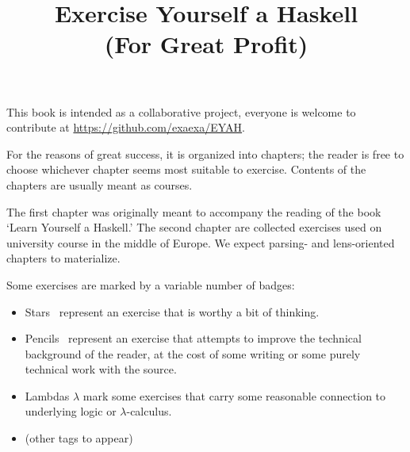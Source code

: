 \documentclass[10pt,a5paper]{book}
\title{Exercise Yourself a Haskell \\ \vspace{1em} \Large (For Great Profit)}
\date{}
\begin{document}
\sloppy

\maketitle

This book is intended as a collaborative project, everyone is welcome to
contribute at \url{https://github.com/exaexa/EYAH}.

For the reasons of great success, it is organized into chapters; the reader is
free to choose whichever chapter seems most suitable to exercise. Contents of
the chapters are usually meant as courses.

The first chapter was originally meant to accompany the reading of the book
`Learn Yourself a Haskell.' The second chapter are collected exercises used on
university course in the middle of Europe. We expect parsing- and lens-oriented
chapters to materialize.

Some exercises are marked by a variable number of badges:
\begin{itemize}
\item Stars \FiveStar\ represent an exercise that is worthy a bit of thinking.
\item Pencils \PencilLeftDown\ represent an exercise that attempts to improve
the technical background of the reader, at the cost of some writing or some
purely technical work with the source.
\item Lambdas {\large $\lambda$} mark some exercises that carry some reasonable
connection to underlying logic or $\lambda$-calculus.
\item (other tags to appear)
\end{itemize}
\end{document}
